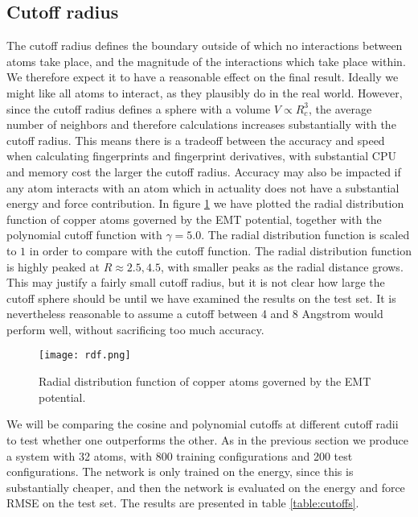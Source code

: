 \subsection{Cutoff radius}
The cutoff radius defines the boundary outside of which no interactions
between atoms take place, and the magnitude of the interactions
which take place within. We therefore expect it to have a reasonable
effect on the final result. Ideally we might like all atoms to interact,
as they plausibly do in the real world.
However, since the cutoff radius defines a sphere
with a volume $V \propto R_c^3$, the average number of neighbors and therefore
calculations increases substantially with the cutoff radius.
This means there is a tradeoff
between the accuracy and speed when calculating fingerprints and
fingerprint derivatives, with substantial CPU and memory cost the
larger the cutoff radius.
Accuracy may also be impacted if any
atom interacts with an atom which in actuality does not have a substantial
energy and force contribution.
In figure \ref{fig:copper-rdf} we have plotted the radial distribution
function of copper atoms governed by the EMT potential, together
with the polynomial cutoff function with $\gamma = 5.0$.
The radial distribution function is scaled to $1$ in order to compare
with the cutoff function.
The radial distribution function is highly peaked at $R \approx 2.5, 4.5$,
with smaller peaks as the radial distance grows.
This may justify a fairly small cutoff radius, but it is not clear
how large the cutoff sphere should be until we have examined the results
on the test set.
It is nevertheless reasonable to assume a cutoff between 4 and 8 Angstrom
would perform well, without sacrificing too much accuracy.

\begin{figure}[H]
    \centering
    \texttt{[image: rdf.png]}
    \caption{Radial distribution function of copper atoms
        governed by the EMT potential.}
    \label{fig:copper-rdf}
\end{figure}

We will be comparing the cosine and polynomial cutoffs at different
cutoff radii to test whether one outperforms the other.
As in the previous section we produce a system with 32 atoms, with
800 training configurations and 200 test configurations. The network
is only trained on the energy, since this is substantially cheaper,
and then the network is evaluated on the energy and force RMSE
on the test set. The results are presented in table \ref{table:cutoffs}.

